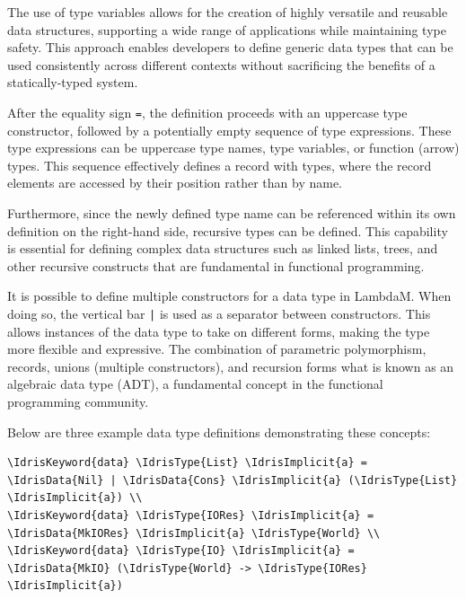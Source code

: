 \documentclass{IEEEtran}
\begin{document}
\par The use of type variables allows for the creation of highly versatile and reusable data structures, supporting a wide range of applications while maintaining type safety. This approach enables developers to define generic data types that can be used consistently across different contexts without sacrificing the benefits of a statically-typed system.

\par After the equality sign \verb!=!, the definition proceeds with an uppercase type constructor, followed by a potentially empty sequence of type expressions. These type expressions can be uppercase type names, type variables, or function (arrow) types. This sequence effectively defines a record with types, where the record elements are accessed by their position rather than by name.

\par Furthermore, since the newly defined type name can be referenced within its own definition on the right-hand side, recursive types can be defined. This capability is essential for defining complex data structures such as linked lists, trees, and other recursive constructs that are fundamental in functional programming.

\par It is possible to define multiple constructors for a data type in LambdaM. When doing so, the vertical bar \verb!|! is used as a separator between constructors. This allows instances of the data type to take on different forms, making the type more flexible and expressive. The combination of parametric polymorphism, records, unions (multiple constructors), and recursion forms what is known as an algebraic data type (ADT), a fundamental concept in the functional programming community.

\par Below are three example data type definitions demonstrating these concepts:

\begin{Verbatim}[commandchars=\\\{\}]
\IdrisKeyword{data} \IdrisType{List} \IdrisImplicit{a} = \IdrisData{Nil} | \IdrisData{Cons} \IdrisImplicit{a} (\IdrisType{List} \IdrisImplicit{a}) \\
\IdrisKeyword{data} \IdrisType{IORes} \IdrisImplicit{a} = \IdrisData{MkIORes} \IdrisImplicit{a} \IdrisType{World} \\
\IdrisKeyword{data} \IdrisType{IO} \IdrisImplicit{a} = \IdrisData{MkIO} (\IdrisType{World} -> \IdrisType{IORes} \IdrisImplicit{a})
\end{Verbatim}
\end{document}
